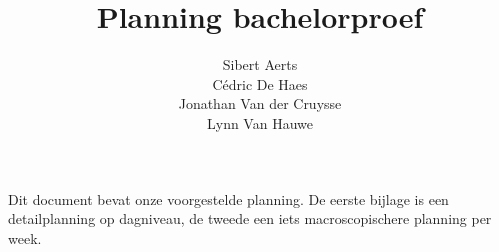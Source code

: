 \documentclass[10pt,a4paper]{article}
\author{Sibert Aerts \\ Cédric De Haes \\ Jonathan Van der Cruysse \\ Lynn Van Hauwe}
\title{Planning bachelorproef}
\begin{document}
	\maketitle
	
	Dit document bevat onze voorgestelde planning. De eerste bijlage is een detailplanning op dagniveau, de tweede een iets macroscopischere planning per week.
	
	
	
\end{document}

